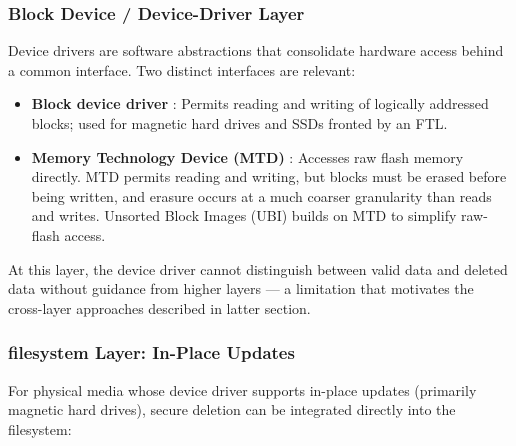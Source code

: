 \subsubsection{Block Device / Device-Driver Layer}
Device drivers are software abstractions that consolidate hardware access behind a common interface. 
Two distinct interfaces are relevant:

\begin{itemize}
    \item \textbf{Block device driver} :  Permits reading and writing of logically addressed blocks; 
    used for magnetic hard drives and SSDs fronted by an FTL.

    \item \textbf{Memory Technology Device (MTD)} : Accesses raw flash memory directly. MTD permits 
    reading and writing, but blocks must be erased before being written, and erasure occurs at a much 
    coarser granularity than reads and writes. Unsorted Block Images (UBI) builds on MTD to simplify 
    raw-flash access.
\end{itemize}

At this layer, the device driver cannot distinguish between valid data and deleted data without 
guidance from higher layers — a limitation that motivates the cross-layer approaches described in 
latter section.

\subsubsection{filesystem Layer: In-Place Updates}
For physical media whose device driver supports in-place updates (primarily magnetic hard drives), 
secure deletion can be integrated directly into the filesystem:

